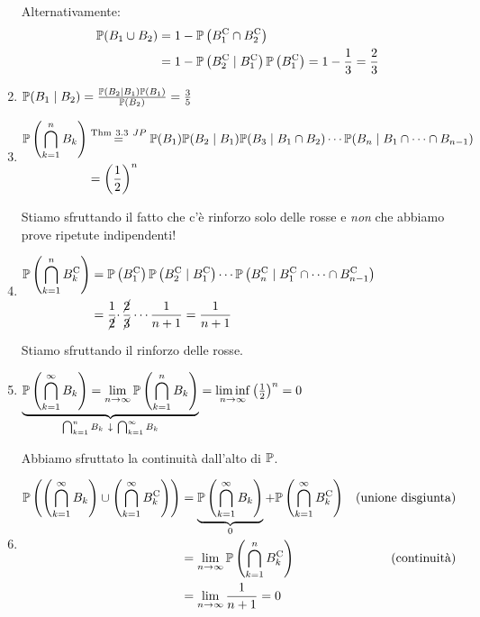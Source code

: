 \begin{enumerate}
	Alternativamente:
	\begin{align*}
		\mathbb{P}(B_{1} \cup B_{2}) & =1-\mathbb{P}\left(B_{1}^{\mathrm{C}} \cap B_{2}^{\mathrm{C}}\right)\\
		 & =1-\mathbb{P}\left(B_{2}^{\mathrm{C}} \mid B_{1}^{\mathrm{C}}\right)\mathbb{P}\left(B_{1}^{\mathrm{C}}\right) =1-\frac{1}{3} =\frac{2}{3}
	\end{align*}
	\item $\mathbb{P}(B_{1} \mid B_{2}) =\frac{\mathbb{P}(B_{2} \mid B_{1})\mathbb{P}(B_{1})}{\mathbb{P}(B_{2})} =\frac{3}{5}$
	\item $
	\begin{aligned}
		\mathbb{P}\left(\bigcap\limits _{k=1}^{n} B_{k}\right) & \overset{\text{Thm} \ 3.3\ JP}{=}\mathbb{P}(B_{1})\mathbb{P}(B_{2} \mid B_{1})\mathbb{P}(B_{3} \mid B_{1} \cap B_{2}) \cdots \mathbb{P}(B_{n} \mid B_{1} \cap \cdots \cap B_{n-1})\\
		 & =\left(\frac{1}{2}\right)^{n}
	\end{aligned}$
	
	Stiamo sfruttando il fatto che c'è rinforzo solo delle rosse e \textit{non} che abbiamo prove ripetute indipendenti!
	\item $
	\begin{aligned}
		\mathbb{P}\left(\bigcap\limits _{k=1}^{n} B_{k}^{\mathrm{C}}\right) & =\mathbb{P}\left(B_{1}^{\mathrm{C}}\right)\mathbb{P}\left(B_{2}^{\mathrm{C}} \mid B_{1}^{\mathrm{C}}\right) \cdots \mathbb{P}\left(B_{n}^{\mathrm{C}} \mid B_{1}^{\mathrm{C}} \cap \cdots \cap B_{n-1}^{\mathrm{C}}\right)\\
		 & =\frac{1}{\cancel{2}} \cdotp \frac{\cancel{2}}{\cancel{3}} \cdots \frac{1}{n+1} =\frac{1}{n+1}
	\end{aligned}$

	Stiamo sfruttando il rinforzo delle rosse.
	\item $\underbrace{\mathbb{P}\left(\bigcap\limits _{k=1}^{\infty } B_{k}\right) =\lim\limits _{n\rightarrow \infty }\mathbb{P}\left(\bigcap\limits _{k=1}^{n} B_{k}\right)}_{\bigcap _{k=1}^{n} B_{k} \ \downarrow \ \bigcap _{k=1}^{\infty } B_{k}} =\liminf\limits _{n\rightarrow \infty }\left(\frac{1}{2}\right)^{n} =0$

	Abbiamo sfruttato la continuità dall'alto di $\mathbb{P}$.
	\item $
	\begin{aligned}
		\mathbb{P}\left(\left(\bigcap\limits _{k=1}^{\infty } B_{k}\right) \cup \left(\bigcap\limits _{k=1}^{\infty } B_{k}^{\mathrm{C}}\right)\right) & =\underbrace{\mathbb{P}\left(\bigcap\limits _{k=1}^{\infty } B_{k}\right)}_{0} +\mathbb{P}\left(\bigcap\limits _{k=1}^{\infty } B_{k}^{\mathrm{C}}\right) & \text{(unione disgiunta)}\\
		 & =\lim\limits _{n\rightarrow \infty }\mathbb{P}\left(\bigcap\limits _{k=1}^{n} B_{k}^{\mathrm{C}}\right) & \text{(continuità)}\\
		 & =\lim\limits _{n\rightarrow \infty }\frac{1}{n+1} =0 & 
	\end{aligned}$
\end{enumerate}

\Soluzione